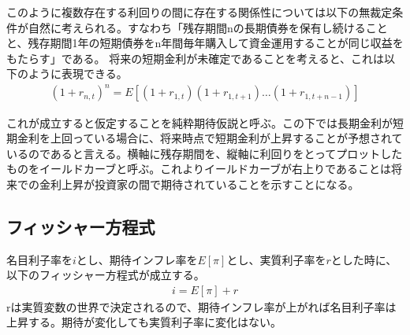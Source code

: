 \documentclass{jsarticle}
\begin{document}
このように複数存在する利回りの間に存在する関係性については以下の無裁定条件が自然に考えられる。すなわち「残存期間nの長期債券を保有し続けることと、残存期間1年の短期債券をn年間毎年購入して資金運用することが同じ収益をもたらす」である。
将来の短期金利が未確定であることを考えると、これは以下のように表現できる。
\begin{align}
	(1 + r_{n, t})^n = E[(1 + r_{1,t})(1 + r_{1, t+1})\dots(1 + r_{1,t+n-1})]
\end{align}

これが成立すると仮定することを純粋期待仮説と呼ぶ。この下では長期金利が短期金利を上回っている場合に、将来時点で短期金利が上昇することが予想されているのであると言える。横軸に残存期間を、縦軸に利回りをとってプロットしたものをイールドカーブと呼ぶ。これよりイールドカーブが右上りであることは将来での金利上昇が投資家の間で期待されていることを示すことになる。

\subsection{フィッシャー方程式}
名目利子率を$i$とし、期待インフレ率を$E[\pi]$とし、実質利子率を$r$とした時に、以下のフィッシャー方程式が成立する。
\begin{align}
	i = E[\pi] + r
\end{align}
rは実質変数の世界で決定されるので、期待インフレ率が上がれば名目利子率は上昇する。期待が変化しても実質利子率に変化はない。
\end{document}
